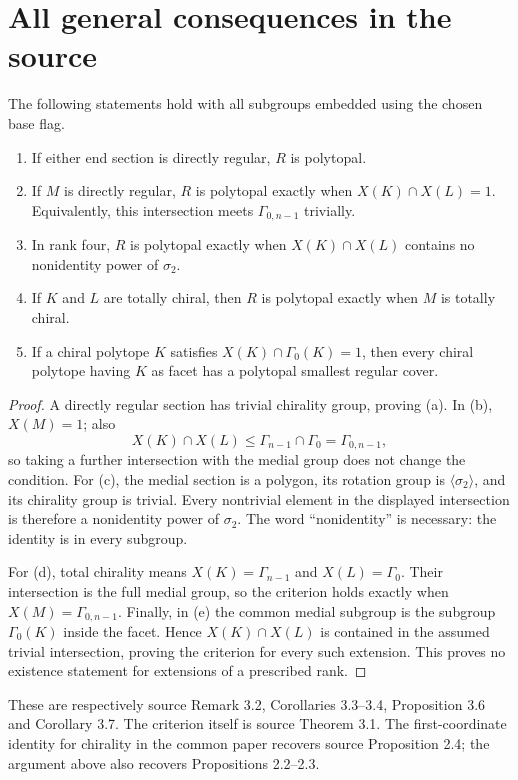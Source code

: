 \section{All general consequences in the source}
\begin{corollary}\label{cor:consequences}
The following statements hold with all subgroups embedded using the chosen base flag.
\begin{enumerate}[label=(\alph*)]
\item If either end section is directly regular, $R$ is polytopal.
\item If $M$ is directly regular, $R$ is polytopal exactly when $X(K)\cap X(L)=1$. Equivalently, this intersection meets $\Gamma_{0,n-1}$ trivially.
\item In rank four, $R$ is polytopal exactly when $X(K)\cap X(L)$ contains no nonidentity power of $\sigma_2$.
\item If $K$ and $L$ are totally chiral, then $R$ is polytopal exactly when $M$ is totally chiral.
\item If a chiral polytope $K$ satisfies $X(K)\cap\Gamma_0(K)=1$, then every chiral polytope having $K$ as facet has a polytopal smallest regular cover.
\end{enumerate}
\end{corollary}
\begin{proof}
A directly regular section has trivial chirality group, proving (a). In (b), $X(M)=1$; also
\[
 X(K)\cap X(L)\leq\Gamma_{n-1}\cap\Gamma_0
                            =\Gamma_{0,n-1},
\]
so taking a further intersection with the medial group does not change the condition. For (c), the medial section is a polygon, its rotation group is $\langle\sigma_2\rangle$, and its chirality group is trivial. Every nontrivial element in the displayed intersection is therefore a nonidentity power of $\sigma_2$. The word ``nonidentity'' is necessary: the identity is in every subgroup.

For (d), total chirality means $X(K)=\Gamma_{n-1}$ and $X(L)=\Gamma_0$. Their intersection is the full medial group, so the criterion holds exactly when $X(M)=\Gamma_{0,n-1}$. Finally, in (e) the common medial subgroup is the subgroup $\Gamma_0(K)$ inside the facet. Hence $X(K)\cap X(L)$ is contained in the assumed trivial intersection, proving the criterion for every such extension. This proves no existence statement for extensions of a prescribed rank.
\end{proof}

These are respectively source Remark 3.2, Corollaries 3.3--3.4, Proposition 3.6 and Corollary 3.7. The criterion itself is source Theorem 3.1. The first-coordinate identity for chirality in the common paper recovers source Proposition 2.4; the argument above also recovers Propositions 2.2--2.3.
